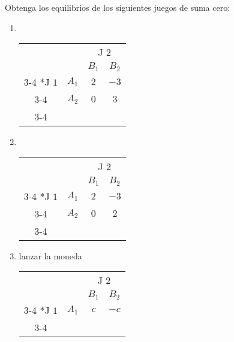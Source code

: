 \documentclass[11pt]{article}
\begin{document}
\begin{flushleft}
\begin{flushleft}
    Obtenga los equilibrios de los siguientes juegos de suma cero:
    \begin{enumerate}[label=\roman*)]
        \item ~\\
        \begin{center}    
            \setlength{\extrarowheight}{0pt}
            \begin{tabular}{cc|c|c|}
                & \multicolumn{1}{c}{} & \multicolumn{2}{c}{J $2$}\\
                & \multicolumn{1}{c}{} & \multicolumn{1}{c}{$B_1$}  & \multicolumn{1}{c}{$B_2$} \\\cline{3-4}
                \multirow{2}*{J $1$}  & $A_1$ & $2$ & $-3$ \\\cline{3-4}
                & $A_2$ & $0$ & $3$ \\\cline{3-4}
            \end{tabular}
        \end{center}
        \item ~\\
        \begin{center}    
            \setlength{\extrarowheight}{0pt}
            \begin{tabular}{cc|c|c|}
                & \multicolumn{1}{c}{} & \multicolumn{2}{c}{J $2$}\\
                & \multicolumn{1}{c}{} & \multicolumn{1}{c}{$B_1$}  & \multicolumn{1}{c}{$B_2$} \\\cline{3-4}
                \multirow{2}*{J $1$}  & $A_1$ & $2$ & $-3$ \\\cline{3-4}
                & $A_2$ & $0$ & $2$ \\\cline{3-4}
            \end{tabular}
        \end{center}
        \item lanzar la moneda\\
        \begin{center}    
            \setlength{\extrarowheight}{0pt}
            \begin{tabular}{cc|c|c|}
                & \multicolumn{1}{c}{} & \multicolumn{2}{c}{J $2$}\\
                & \multicolumn{1}{c}{} & \multicolumn{1}{c}{$B_1$}  & \multicolumn{1}{c}{$B_2$} \\\cline{3-4}
                \multirow{2}*{J $1$}  & $A_1$ & $c$ & $-c$ \\\cline{3-4}

\end{tabular}
\end{center}
\end{enumerate}
\end{flushleft}
\end{flushleft}
\end{document}
